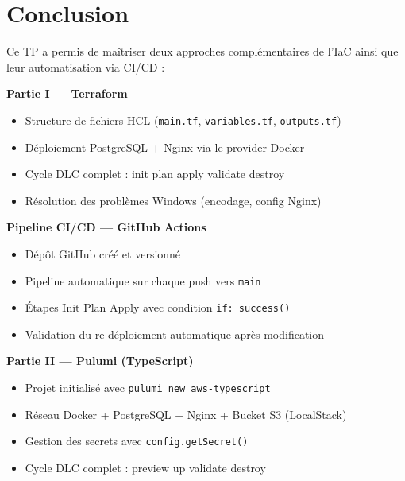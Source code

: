 \documentclass[12pt,a4paper]{article}
\begin{document}
\section{Conclusion}

Ce TP a permis de maîtriser deux approches complémentaires de l'IaC ainsi
que leur automatisation via CI/CD :

\begin{successbox}
\textbf{Partie I --- Terraform} \checkmark
\begin{itemize}[leftmargin=1.5em,topsep=0pt]
  \item Structure de fichiers HCL (\texttt{main.tf}, \texttt{variables.tf}, \texttt{outputs.tf})
  \item Déploiement PostgreSQL + Nginx via le provider Docker
  \item Cycle DLC complet : init \textrightarrow{} plan \textrightarrow{} apply \textrightarrow{} validate \textrightarrow{} destroy
  \item Résolution des problèmes Windows (encodage, config Nginx)
\end{itemize}
\end{successbox}

\vspace{0.5em}

\begin{successbox}
\textbf{Pipeline CI/CD --- GitHub Actions} \checkmark
\begin{itemize}[leftmargin=1.5em,topsep=0pt]
  \item Dépôt GitHub créé et versionné
  \item Pipeline automatique sur chaque push vers \texttt{main}
  \item Étapes Init \textrightarrow{} Plan \textrightarrow{} Apply avec condition \texttt{if: success()}
  \item Validation du re-déploiement automatique après modification
\end{itemize}
\end{successbox}

\vspace{0.5em}

\begin{successbox}
\textbf{Partie II --- Pulumi (TypeScript)} \checkmark
\begin{itemize}[leftmargin=1.5em,topsep=0pt]
  \item Projet initialisé avec \texttt{pulumi new aws-typescript}
  \item Réseau Docker + PostgreSQL + Nginx + Bucket S3 (LocalStack)
  \item Gestion des secrets avec \texttt{config.getSecret()}
  \item Cycle DLC complet : preview \textrightarrow{} up \textrightarrow{} validate \textrightarrow{} destroy
\end{itemize}
\end{successbox}
\end{document}
